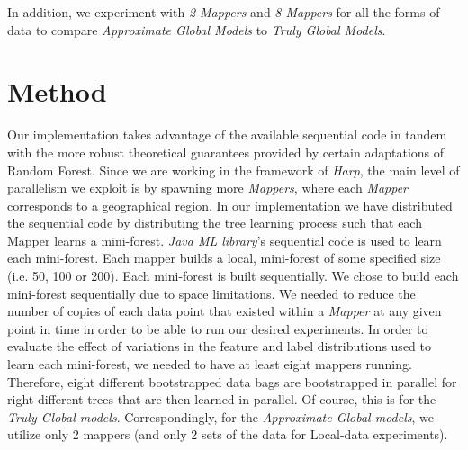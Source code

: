 \documentclass{sig-alternate-05-2015}
\begin{document}
In addition, we experiment with \textit{2 Mappers} and \textit{8 Mappers} for all the forms of data to compare \textit{Approximate Global Models} to \textit{Truly Global Models}.

\section{Method}
Our implementation takes advantage of the available sequential code in tandem with the more robust theoretical guarantees provided by certain adaptations of Random Forest. Since we are working in the framework of \textit{Harp}, the main level of parallelism we exploit is by spawning more \textit{Mappers}, where each \textit{Mapper} corresponds to a geographical region. In our implementation we have distributed the sequential code by distributing the tree learning process such that each Mapper learns a mini-forest. \textit{Java ML library}'s sequential code is used to learn each mini-forest. Each mapper builds a local, mini-forest of some specified size (i.e. 50, 100 or 200). Each mini-forest is built sequentially. We chose to build each mini-forest sequentially due to space limitations. We needed to reduce the number of copies of each data point that existed within a \textit{Mapper} at any given point in time in order to be able to run our desired experiments. In order to  evaluate the effect of variations in the feature and label distributions used to learn each mini-forest, we needed to have at least eight mappers running. Therefore, eight different bootstrapped data bags are bootstrapped in parallel for right different trees that are then learned in parallel. Of course, this is for the \textit{Truly Global models}. Correspondingly, for the \textit{Approximate Global models}, we utilize only 2 mappers (and only 2 sets of the data for Local-data experiments). 
\end{document}
